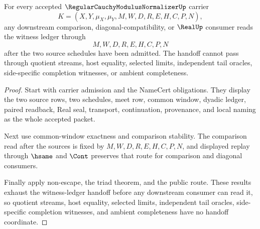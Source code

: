 \begin{theorem}
\label{thm:regular-cauchy-modulus-normalizer-witness-ledger-handoff}
For every accepted $\RegularCauchyModulusNormalizerUp$ carrier
$$
K=(X,Y,\mu_X,\mu_Y,M,W,D,R,E,H,C,P,N),
$$
any downstream comparison, diagonal-compatibility, or $\RealUp$ consumer reads
the witness ledger through
$$
M,W,D,R,E,H,C,P,N
$$
after the two source schedules have been admitted. The handoff cannot pass
through quotient streams, host equality, selected limits, independent tail
oracles, side-specific completion witnesses, or ambient completeness.
\end{theorem}
\begin{proof}
Start with carrier admission and the NameCert obligations. They display the
two source rows, two schedules, meet row, common window, dyadic ledger, paired
readback, Real seal, transport, continuation, provenance, and local naming as
the whole accepted packet.

Next use common-window exactness and comparison stability. The comparison read
after the sources is fixed by $M,W,D,R,E,H,C,P,N$, and displayed replay through
$\hsame$ and $\Cont$ preserves that route for comparison and diagonal consumers.

Finally apply non-escape, the triad theorem, and the public route. These
results exhaust the witness-ledger handoff before any downstream consumer can
read it, so quotient streams, host equality, selected limits, independent tail
oracles, side-specific completion witnesses, and ambient completeness have no
handoff coordinate.
\end{proof}

